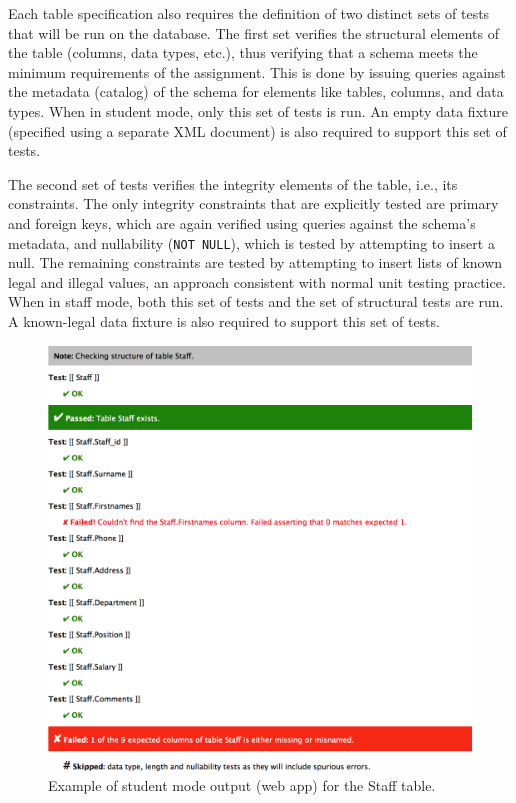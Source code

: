 \documentclass[sigconf, authordraft, capitalise]{acmart}
\begin{document}
Each table specification also requires the definition of two distinct sets of tests that will be run on the database. The first set verifies the structural elements of the table (columns, data types, etc.), thus verifying that a schema meets the minimum requirements of the assignment. This is done by issuing queries against the metadata (catalog) of the schema for elements like tables, columns, and data types. When in student mode, only this set of tests is run. An empty data fixture (specified using a separate XML document) is also required to support this set of tests.

The second set of tests verifies the integrity elements of the table, i.e., its constraints. The only integrity constraints that are explicitly tested are primary and foreign keys, which are again verified using queries against the schema's metadata, and nullability (\texttt{NOT NULL}), which is tested by attempting to insert a null. The remaining constraints are tested by attempting to insert lists of known legal and illegal values, an approach consistent with normal unit testing practice. When in staff mode, both this set of tests and the set of structural tests are run. A known-legal data fixture is also required to support this set of tests.


\begin{figure}
    \includegraphics[width=0.95\columnwidth,keepaspectratio]{images/web_output.png}
    \caption{Example of student mode output (web app) for the \textsf{Staff} table.}
    \label{fig-student-output}
\end{figure}
\end{document}
